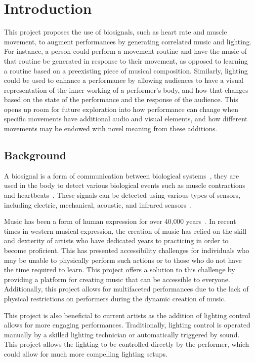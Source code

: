 \chapter{Introduction}
This project proposes the use of biosignals, such as heart rate and muscle movement, to augment performances by generating correlated music and lighting.
For instance, a person could perform a movement routine and have the music of that routine be generated in response to their movement,
as opposed to learning a routine based on a preexisting piece of musical composition.
Similarly, lighting could be used to enhance a performance by allowing audiences to have a visual representation of the inner working of a performer's body,
and how that changes based on the state of the performance and the response of the audience.
This opens up room for future exploration into how performance can change when specific movements have additional audio and visual elements,
and how different movements may be endowed with novel meaning from these additions.

\section{Background}
A biosignal is a form of communication between biological systems~\cite{semmlow:2018},
they are used in the body to detect various biological events such as muscle contractions and heartbeats~\cite{escabí:2012}.
These signals can be detected using various types of sensors, including electric, mechanical, acoustic, and infrared sensors~\cite{kaniusas:2012}.

Music has been a form of human expression for over 40,000 years~\cite{killin:2018}.
In recent times in western musical expression, the creation of music has relied on the skill and dexterity of artists
who have dedicated years to practicing in order to become proficient.
This has presented accessibility challenges for individuals who may be unable to physically perform such actions
or to those who do not have the time required to learn.
This project offers a solution to this challenge by providing a platform for creating music that can be accessible to everyone.
Additionally, this project allows for multifaceted performances due to the lack of physical restrictions on performers
during the dynamic creation of music.

This project is also beneficial to current artists as the addition of lighting control allows for more engaging performances.
Traditionally, lighting control is operated manually by a skilled lighting technician or automatically triggered by sound.
This project allows the lighting to be controlled directly by the performer, which could allow for much more compelling lighting setups.

